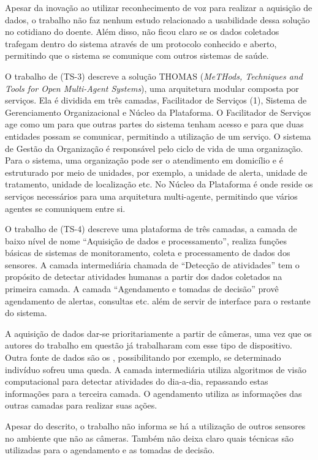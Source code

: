 Apesar da inovação ao utilizar reconhecimento de voz para realizar a aquisição
de dados, o trabalho não faz nenhum estudo relacionado a usabilidade dessa
solução no cotidiano do doente. Além disso, não ficou claro se os dados
coletados trafegam dentro do sistema através de um protocolo conhecido e
aberto, permitindo que o sistema se comunique com outros sistemas de saúde.

O trabalho de  (TS-3) descreve a solução THOMAS
(\textit{MeTHods, Techniques and Tools for Open Multi-Agent Systems}), uma
arquitetura modular composta por serviços. Ela é dividida em três camadas,
Facilitador de Serviços (1), Sistema de Gerenciamento Organizacional e Núcleo
da Plataforma. O Facilitador de Serviços age como um \gateway[] para que outras
partes do sistema tenham acesso e para que duas entidades possam se comunicar,
permitindo a utilização de um serviço. O sistema de Gestão da Organização é
responsável pelo ciclo de vida de uma organização. Para o sistema, uma
organização pode ser o atendimento em domicílio e é estruturado por meio de
unidades, por exemplo, a unidade de alerta, unidade de tratamento, unidade de
localização  etc. No Núcleo da Plataforma é onde reside os serviços necessários
para uma arquitetura multi-agente, permitindo que vários agentes se comuniquem
entre si.

O trabalho de  (TS-4) descreve uma plataforma de três
camadas, a camada de baixo nível de nome ``Aquisição de dados e
processamento'', realiza funções básicas de sistemas de monitoramento, coleta e
processamento de dados dos sensores. A camada intermediária chamada de
``Detecção de atividades'' tem o propósito de detectar atividades humanas a
partir dos dados coletados na primeira camada. A camada ``Agendamento e tomadas
de decisão'' provê agendamento de alertas, consultas etc.  além de servir de
interface para o restante do sistema.

A aquisição de dados dar-se prioritariamente a partir de câmeras, uma vez que
os autores do trabalho em questão já trabalharam com esse tipo de dispositivo.
Outra fonte de dados são os \smartphones, possibilitando por exemplo, se
determinado indivíduo sofreu uma queda. A camada intermediária utiliza
algoritmos de visão computacional para detectar atividades do dia-a-dia,
repassando estas informações para a terceira camada. O agendamento utiliza as
informações das outras camadas para realizar suas ações. 

Apesar do descrito, o trabalho não informa se há a utilização de outros
sensores no ambiente que não as câmeras. Também não deixa claro quais
técnicas são utilizadas para o agendamento e as tomadas de decisão.

